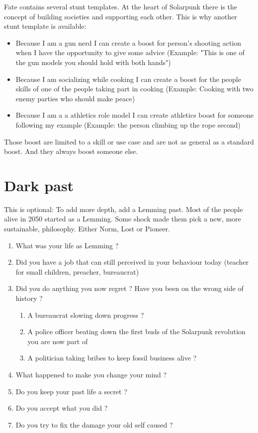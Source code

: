 Fate contains several stunt templates. At the heart of Solarpunk there is the concept of building societies and supporting each other. This is why another stunt template is available:

\begin{itemize}
    \item Because I am a gun nerd I can create a boost for person's shooting action when I have the opportunity to give some advice (Example: "This is one of the gun models you should hold with both hands")
    \item Because I am socializing while cooking I can create a boost for the people skills of one of the people taking part in cooking (Example: Cooking with two enemy parties who should make peace)
    \item Because I am a a athletics role model I can create athletics boost for someone following my example (Example: the person climbing up the rope second)
\end{itemize}

Those boost are limited to a skill or use case and are not as general as a standard boost. And they always boost someone else.


\section{Dark past}

This is optional: To add more depth, add a Lemming past. Most of the people alive in 2050 started as a Lemming. Some shock made them pick a new, more sustainable, philosophy. Either Norm, Lost or Pioneer.

\begin{enumerate}
    \item What was your life as Lemming ?
    \item Did you have a job that can still perceived in your behaviour today (teacher for small children, preacher, bureaucrat)
    \item Did you do anything you now regret ? Have you been on the wrong side of history ?
    \begin{enumerate}
        \item A bureaucrat slowing down progress ?
        \item A police officer beating down the first buds of the Solarpunk revolution you are now part of
        \item A politician taking bribes to keep fossil business alive ?
    \end{enumerate}
    \item What happened to make you change your mind ?
    \item Do you keep your past life a secret ?
    \item Do you accept what you did ?
    \item Do you try to fix the damage your old self caused ?
\end{enumerate}

